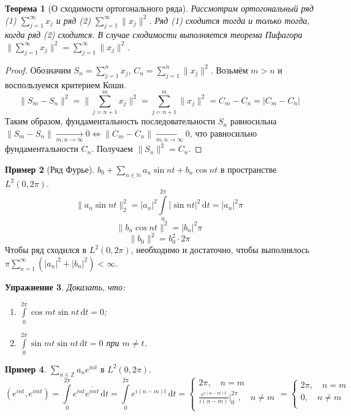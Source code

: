 \documentclass[11pt,openany,a4paper]{scrartcl}
\theoremstyle{plain}
\newtheorem{theorem}{Теорема}[subsection]
\newtheorem{exercise}[theorem]{Упражнение}
\theoremstyle{definition}
\newtheorem{example}[theorem]{Пример}
\newcommand\mb{\mathbb}
\newcommand{\underto}[1]{\xrightarrow[#1]{}}
\newcommand{\dif}{\, \mathrm d}
\newcommand\ol{\overline}
\begin{document}
\begin{theorem}[О сходимости ортогонального ряда]
\label{orthogonal_series_convergence}
    Рассмотрим ортогональный ряд (1) $\sum\limits_{j=1}^\infty x_j$ и ряд (2)
    $\sum\limits_{j=1}^\infty \|x_j\|^2$. Ряд (1) сходится тогда и только тогда,
    когда ряд (2) сходится. В случае сходимости выполняется теорема Пифагора
    $\Big\|\sum\limits_{j=1}^\infty x_j\Big\|^2 = \sum\limits_{j=1}^\infty \|x_j\|^2$.
\end{theorem}
\begin{proof}
    Обозначим $S_n = \sum\limits_{j=1}^nx_j$,
    $C_n = \sum\limits_{j=1}^n\|x_j\|^2$. Возьмём $m > n$ и воспользуемся 
    критерием Коши.
    $$
    \|S_m - S_n\|^2 = \bigg\|\sum\limits_{j=n+1}^m x_j\bigg\|^2 =
    \sum\limits_{j=n+1}^m \|x_j\|^2 = C_m - C_n = |C_m - C_n|
    $$
    Таким образом, фундаментальность последовательности $S_n$ равносильна
    $\|S_m - S_n\| \underto{m,n \to \infty} 0 \iff \|C_m - C_n\|
    \underto{m,n \to \infty} 0$, что равносильно фундаментальности $C_n$.
    Получаем $\|S_n\|^2 = C_n$.
\end{proof}

\begin{example}[Ряд Фурье]
    $b_0 + \sum\limits_{n \in \mb N}a_n\sin nt + b_n \cos nt$ в пространстве
    $L^2(0, 2\pi)$.
    $$
    \|a_n \sin nt\|_2^2 = |a_n|^2\int\limits_0^{2\pi}|\sin nt|^2\dif t =
    |a_n|^2\pi
    $$
    $$
    \|b_n\cos nt\|^2 = |b_n|^2 \pi
    $$
    $$
    \|b_0\|^2 = b_0^2\cdot 2\pi
    $$
    Чтобы ряд сходился в $L^2(0, 2\pi)$, необходимо и достаточно, чтобы 
    выполнялось $\pi\sum\limits_{n=1}^\infty(|a_n|^2 + |b_n|^2) < \infty$.
\end{example}
\begin{exercise}
    Доказать, что:
    \begin{enumerate}
        \item $\int\limits_0^{2\pi} \cos mt\sin nt \dif t = 0$;
        \item $\int\limits_0^{2\pi} \sin mt\sin nt \dif t = 0$ при $m \neq t$.
    \end{enumerate}
\end{exercise}

\begin{example}
    $\sum\limits_{n \in \mb Z} a_n e^{int}$ в $L^2(0, 2\pi)$.
    $$
    (e^{int}, e^{imt}) = \int\limits_0^{2\pi}e^{int}\ol{e^{imt}}\dif t =
     \int\limits_0^{2\pi} e^{i(n - m)t}\dif t =
     \begin{cases}
         2\pi,\quad n = m \\
         \frac{e^{i(n-m)t}}{i(n-m)}\bigg|_0^{2\pi},\quad n \neq m \\
     \end{cases} =
     \begin{cases}
         2\pi,\quad n = m \\
         0,\quad n \neq m \\
     \end{cases}
    $$
\end{example}
\end{document}
